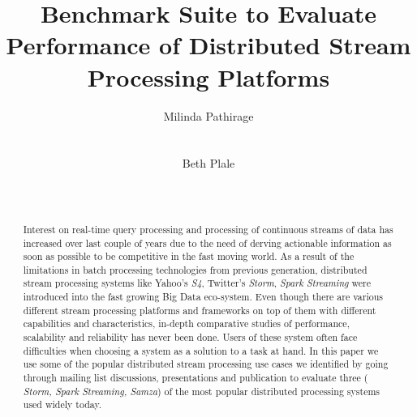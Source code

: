 \documentclass{sig-alternate}
\begin{document}
%

\title{Benchmark Suite to Evaluate Performance of Distributed Stream
  Processing Platforms}


\author{
\alignauthor
Milinda Pathirage\\
       \\
       \\
\alignauthor
Beth Plale\\
       \\
       \\
}

\maketitle
\begin{abstract}
Interest on real-time query processing and processing of continuous
streams of data has increased over last couple of years due to the need
of derving actionable information as soon as possible
 to be competitive in the fast moving world. As a result of the limitations
 in batch processing technologies from previous generation, distributed
 stream processing systems like Yahoo's \textit{S4}, Twitter's \textit{Storm}, \textit{Spark
 Streaming} were introduced into the fast growing Big Data eco-system.
 Even though there are various different stream processing platforms
 and frameworks on top of them with different capabilities and
 characteristics, in-depth comparative studies of performance, scalability and
 reliability has never been done. Users of these system often face
 difficulties when choosing a system as a solution to a task at hand.
 In this paper we use some of the popular distributed stream
 processing use cases we identified by going through mailing list
 discussions, presentations and publication to evaluate three (
 \textit{Storm, Spark Streaming, Samza}) of the
 most popular distributed processing systems used widely today.
\end{abstract}
\end{document}

